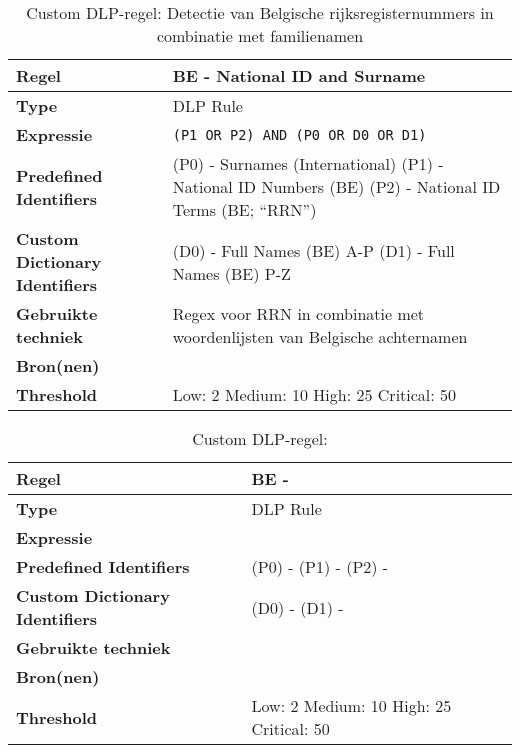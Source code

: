 \begin{table}[h]
    \centering
    \small
    \begin{tabular}{p{4cm} p{10cm}}
        \toprule
        \textbf{Regel} & BE - National ID and Surname \\
        \midrule
        \textbf{Type} & DLP Rule \\
        \textbf{Expressie} & \texttt{(P1 OR P2) AND (P0 OR D0 OR D1)} \\
        \textbf{Predefined Identifiers} & 
        (P0) - Surnames (International) \newline
        (P1) - National ID Numbers (BE) \newline
        (P2) - National ID Terms (BE; “RRN”) \\
        \textbf{Custom Dictionary Identifiers} & 
        (D0) - Full Names (BE) A-P \newline
        (D1) - Full Names (BE) P-Z \\
        \textbf{Gebruikte techniek} & Regex voor RRN in combinatie met woordenlijsten van Belgische achternamen \\
        \textbf{Bron(nen)} & \textcite{Statbel2023, Statbel2024} \\
        \textbf{Threshold} & Low: 2 \quad Medium: 10 \quad High: 25 \quad Critical: 50 \\
        \bottomrule
    \end{tabular}
    \caption{Custom DLP-regel: Detectie van Belgische rijksregisternummers in combinatie met familienamen}
    \label{tab:custom-be-id}
\end{table}



\begin{table}[h]
    \centering
    \small
    \begin{tabular}{p{4cm} p{10cm}}
        \toprule
        \textbf{Regel} & BE -  \\
        \midrule
        \textbf{Type} & DLP Rule \\
        \textbf{Expressie} & \texttt{} \\
        \textbf{Predefined Identifiers} & 
        (P0) - \newline
        (P1) - \newline
        (P2) -  \\
        \textbf{Custom Dictionary Identifiers} & 
        (D0) - \newline
        (D1) - \\
        \textbf{Gebruikte techniek} & \\
        \textbf{Bron(nen)} & \textcite{} \\
        \textbf{Threshold} & Low: 2 \quad Medium: 10 \quad High: 25 \quad Critical: 50 \\
        \bottomrule
    \end{tabular}
    \caption{Custom DLP-regel: }
    \label{tab:custom-}
\end{table}



